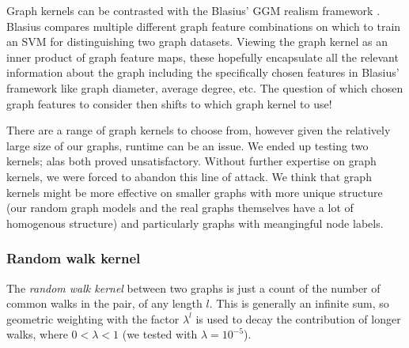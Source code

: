 Graph kernels can be contrasted with the Blasius' GGM realism framework . Blasius compares multiple different graph feature combinations on which to train an SVM for distinguishing two graph datasets.
Viewing the graph kernel as an inner product of graph feature maps, these hopefully encapsulate all the relevant information about the graph including the specifically chosen features in Blasius' framework like graph diameter, average degree, etc. The question of which chosen graph features to consider then shifts to which graph kernel to use!










There are a range of graph kernels to choose from, however given the relatively large size of our graphs, runtime can be an issue. We ended up testing two kernels; alas both proved unsatisfactory. Without further expertise on graph kernels, we were forced to abandon this line of attack. We think that graph kernels might be more effective on smaller graphs with more unique structure (our random graph models and the real graphs themselves have a lot of homogenous structure) and particularly graphs with meangingful node labels.

\subsubsection{Random walk kernel}
The \textit{random walk kernel} between two graphs is just a count of the number of common walks in the pair,  of any length $l$. This is generally an infinite sum, so geometric weighting with the factor $\lambda^l$ is used to decay the contribution of longer walks, where $0 < \lambda < 1$ (we tested with $\lambda=10^{-5}$).

